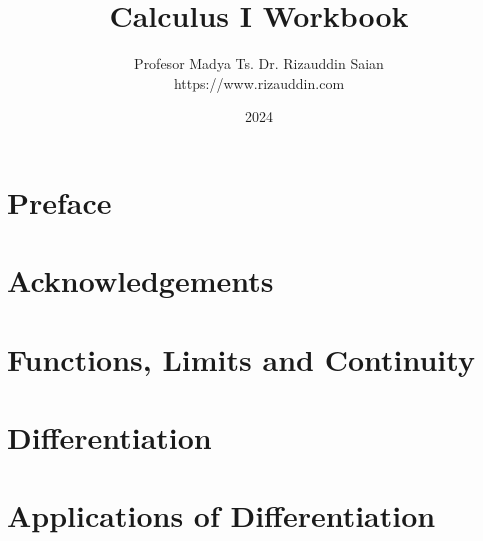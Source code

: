 \documentclass[12pt,a4paper,oneside]{report}
\title{Calculus I Workbook}
\author{Profesor Madya Ts. Dr. Rizauddin Saian\\
https://www.rizauddin.com
}
\date{2024}
\begin{document}

%

\frontmatter

\maketitle

%



\chapter*{Preface}


\chapter*{Acknowledgements}


\tableofcontents

\mainmatter
\chapter{Functions, Limits and Continuity}
\makenewpage
\makenewpage
\makenewpage
\makenewpage
\makenewpage
\makenewpage
\makenewpage

\chapter{Differentiation}
\makenewpage
\makenewpage
\makenewpage
\makenewpage
\makenewpage
\makenewpage

\chapter{Applications of Differentiation}
\makenewpage
\makenewpage
\makenewpage  
\makenewpage
\makenewpage
\end{document}

